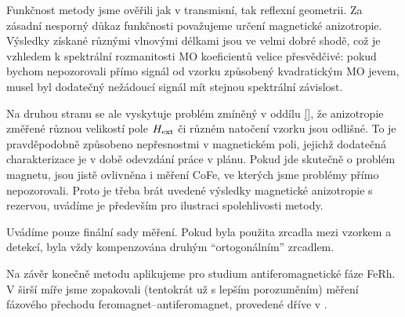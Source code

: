 Funkčnost metody jsme ověřili jak v transmisní, tak reflexní geometrii.
Za zásadní nesporný důkaz funkčnosti považujeme určení magnetické anizotropie.
Výsledky získané různými vlnovými délkami jsou ve velmi dobré shodě, což je vzhledem k spektrální rozmanitosti MO koeficientů velice přesvědčivé: pokud bychom nepozorovali přímo signál od vzorku způsobený kvadratickým MO jevem, musel byl dodatečný nežádoucí signál mít stejnou spektrální závislost.

Na druhou stranu se ale vyskytuje problém zmíněný v oddílu \ref{}, že anizotropie změřené různou velikostí pole $H_\textrm{ext}$ či různém natočení vzorku jsou odlišné.
To je pravděpodobně způsobeno nepřesnostmi v magnetickém poli, jejichž dodatečná charakterizace je v době odevzdání práce v plánu.
Pokud jde skutečně o problém magnetu, jsou jistě ovlivněna i měření CoFe, ve kterých jsme problémy přímo nepozorovali.
Proto je třeba brát uvedené výsledky magnetické anizotropie s rezervou, uvádíme je především pro ilustraci spolehlivosti metody.

Uvádíme pouze finální sady měření.
Pokud byla použita zrcadla mezi vzorkem a detekcí, byla vždy kompenzována druhým ``ortogonálním'' zrcadlem.

Na závěr konečně metodu aplikujeme pro studium antiferomagnetické fáze FeRh. 
V širší míře jsme zopakovali (tentokrát už s lepším porozuměním) měření fázového přechodu feromagnet--antiferomagnet, provedené dříve v \cite{kubascikMagnetooptickeStudiumAntiferomagnetickych2019}.
